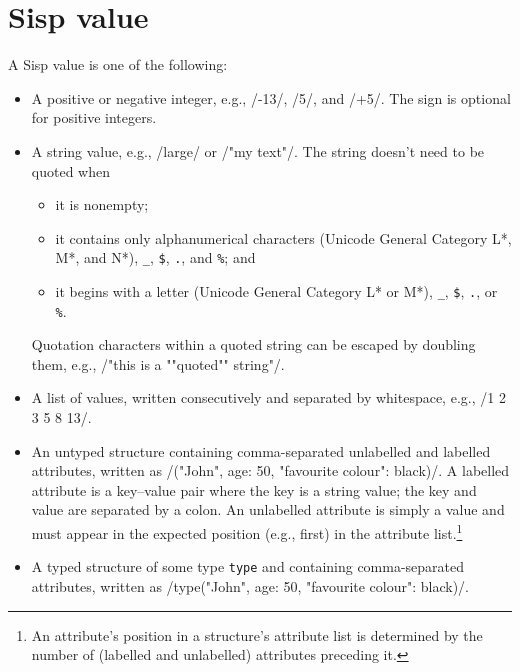 \documentclass[main.tex]{subfiles}
\begin{document}
\section*{Sisp value}
A Sisp value is one of the following:
\begin{itemize}
	
	\item A positive or negative integer, e.g., \iil/-13/, \iil/5/, and \iil/+5/. The sign is optional for positive integers.
	
	\item A string value, e.g., \iil/large/ or \iil/"my text"/. The string doesn't need to be quoted when
	\begin{itemize}[nosep]
		\item it is nonempty;
		\item it contains only alphanumerical characters (Unicode General Category L*, M*, and N*), \texttt{_}, \texttt{\$}, \texttt{.}, and \texttt{\%}; and
		\item it begins with a letter (Unicode General Category L* or M*), \texttt{_}, \texttt{\$}, \texttt{.}, or \texttt{\%}.
	\end{itemize}
	Quotation characters within a quoted string can be escaped by doubling them, e.g., \iil/"this is a ""quoted"" string"/.
	
	\item A list of values, written consecutively and separated by whitespace, e.g., \iil/1 2 3 5 8 13/.
	
	\item An untyped structure containing comma-separated unlabelled and labelled attributes, written as \iil/("John", age: 50, "favourite colour": black)/. A labelled attribute is a key–value pair where the key is a string value; the key and value are separated by a colon. An unlabelled attribute is simply a value and must appear in the expected position (e.g., first) in the attribute list.\footnote{An attribute's position in a structure's attribute list is determined by the number of (labelled and unlabelled) attributes preceding it.}
	
	\item A typed structure of some type \texttt{type} and containing comma-separated attributes, written as \iil/type("John", age: 50, "favourite colour": black)/.
	
\end{itemize}
\end{document}
